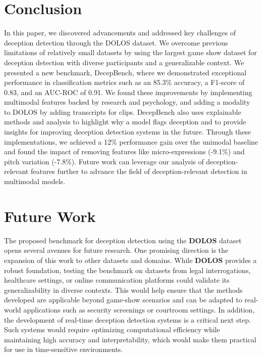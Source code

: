 \documentclass[11pt]{article}
\begin{document}
\section{Conclusion}
In this paper, we discovered advancements and addressed key challenges of deception detection through the DOLOS dataset. We overcome previous limitations of relatively small datasets by using the largest game show dataset for deception detection with diverse participants and a generalizable context. We presented a new benchmark, DecepBench, where we demonstrated exceptional performance in classification metrics such as an 85.3\% accuracy, a F1-score of 0.83, and an AUC-ROC of 0.91. We found these improvements by implementing multimodal features backed by research and psychology, and adding a modality to DOLOS \citep{guo2023audiovisualdeceptiondetectiondolos} by adding transcripts for clips. DecepBench also uses explainable methods and analysis to highlight why a model flags deception and to provide insights for improving deception detection systems in the future. Through these implementations, we achieved a 12\% performance gain over the unimodal baseline and found the impact of removing features like micro-expressions (-9.1\%) and pitch variation (-7.8\%). Future work can leverage our analysis of deception-relevant features further to advance the field of deception-relevant detection in multimodal models.

\section{Future Work}

The proposed benchmark for deception detection using the \textbf{DOLOS} dataset opens several avenues for future research. One promising direction is the expansion of this work to other datasets and domains. While \textbf{DOLOS} provides a robust foundation, testing the benchmark on datasets from legal interrogations, healthcare settings, or online communication platforms could validate its generalizability in diverse contexts. This would help ensure that the methods developed are applicable beyond game-show scenarios and can be adapted to real-world applications such as security screenings or courtroom settings. In addition, the development of real-time deception detection systems is a critical next step. Such systems would require optimizing computational efficiency while maintaining high accuracy and interpretability, which would make them practical for use in time-sensitive environments.
\end{document}
